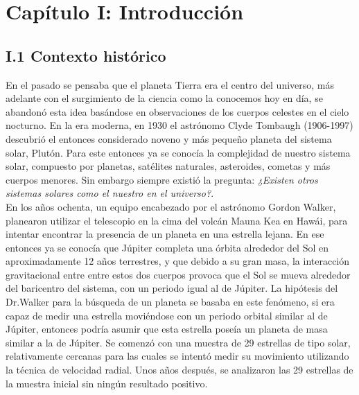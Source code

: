 \chapter*{\textbf{Capítulo I: Introducción}}
\setcounter{chapter}{1}
\setcounter{equation}{0}
\setcounter{figure}{0}
\setcounter{table}{0}

\section*{I.1 Contexto histórico}

En el pasado se pensaba que el planeta Tierra era el centro del universo, más adelante con el surgimiento de la ciencia como la conocemos hoy en día, se abandonó esta idea basándose en observaciones de los cuerpos celestes en el cielo nocturno. En la era moderna, en 1930 el astrónomo Clyde Tombaugh (1906-1997) descubrió el entonces considerado noveno y más pequeño planeta del sistema solar, Plutón. Para este entonces ya se conocía la complejidad de nuestro sistema solar, compuesto por planetas, satélites naturales, asteroides, cometas y más cuerpos menores. Sin embargo siempre existió la pregunta: \textit{¿Existen otros sistemas solares como el nuestro en el universo?}.\\

En los años ochenta, un equipo encabezado por el astrónomo Gordon Walker, planearon utilizar el telescopio en la cima del volcán Mauna Kea en Hawái, para intentar encontrar la presencia de un planeta en una estrella lejana. En ese entonces ya se conocía que Júpiter completa una órbita alrededor del Sol en aproximadamente 12 años terrestres, y que debido a su gran masa, la interacción gravitacional entre entre estos dos cuerpos provoca que el Sol se mueva alrededor del baricentro del sistema, con un periodo igual al de Júpiter. La hipótesis del Dr.Walker para la búsqueda de un planeta se basaba en este fenómeno, si era capaz de medir una estrella moviéndose con un periodo orbital similar al de Júpiter, entonces podría asumir que esta estrella poseía un planeta de masa similar a la de Júpiter. Se comenzó con una muestra de 29 estrellas de tipo solar, relativamente cercanas para las cuales se intentó medir su movimiento utilizando la técnica de velocidad radial. Unos años después, se analizaron las 29 estrellas de la muestra inicial sin ningún resultado positivo.\\ 

